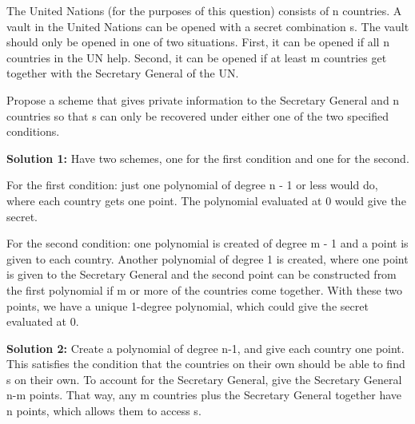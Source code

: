 \question The United Nations (for the purposes of this question) consists of n countries.
A vault in the United Nations can be opened with a secret combination s. The vault should
only be opened in one of two situations. First, it can be opened if all n countries in the UN help.
Second, it can be opened if at least m countries get together with the Secretary General of the UN.

Propose a scheme that gives private information to the Secretary General and n countries so that s can
only be recovered under either one of the two specified conditions.

 
\begin{solution}
\textbf{Solution 1: }
Have two schemes, one for the first condition and one for the second.

For the first condition: just one polynomial of degree n - 1 or less would do, where each country gets one point. The polynomial evaluated at 0 would give the secret.

For the second condition: one polynomial is created of degree m - 1 and a point is given to each
country. Another polynomial of degree 1 is created, where one point is given to the Secretary General
and the second point can be constructed from the first polynomial if m or more of the countries come
together. With these two points, we have a unique 1-degree polynomial, which could give the secret
evaluated at 0.

\textbf{Solution 2: }
Create a polynomial of degree n-1, and give each country one point. This satisfies the condition that the countries on their own should be able to find s on their own. To account for the Secretary General, give the Secretary General n-m points. That way, any m countries plus the Secretary General together have n points, which allows them to access s.
\end{solution}
\newpage